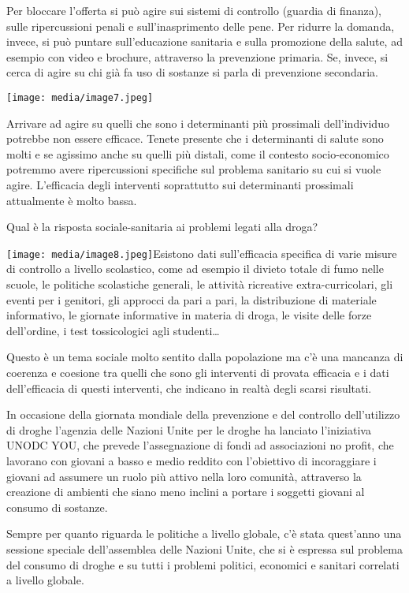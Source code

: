 \documentclass[]{article}
\begin{document}
Per bloccare l'offerta si può agire sui sistemi di controllo (guardia di
finanza), sulle ripercussioni penali e sull'inasprimento delle pene. Per
ridurre la domanda, invece, si può puntare sull'educazione sanitaria e
sulla promozione della salute, ad esempio con video e brochure,
attraverso la prevenzione primaria. Se, invece, si cerca di agire su chi
già fa uso di sostanze si parla di prevenzione secondaria.

\texttt{[image: media/image7.jpeg]}

Arrivare ad agire su quelli che sono i determinanti più prossimali
dell'individuo potrebbe non essere efficace. Tenete presente che i
determinanti di salute sono molti e se agissimo anche su quelli più
distali, come il contesto socio-economico potremmo avere ripercussioni
specifiche sul problema sanitario su cui si vuole agire. L'efficacia
degli interventi soprattutto sui determinanti prossimali attualmente è
molto bassa.

Qual è la risposta sociale-sanitaria ai problemi legati alla droga?

\texttt{[image: media/image8.jpeg]}Esistono dati sull'efficacia
specifica di varie misure di controllo a livello scolastico, come ad
esempio il divieto totale di fumo nelle scuole, le politiche scolastiche
generali, le attività ricreative extra-curricolari, gli eventi per i
genitori, gli approcci da pari a pari, la distribuzione di materiale
informativo, le giornate informative in materia di droga, le visite
delle forze dell'ordine, i test tossicologici agli studenti\ldots{}

Questo è un tema sociale molto sentito dalla popolazione ma c'è una
mancanza di coerenza e coesione tra quelli che sono gli interventi di
provata efficacia e i dati dell'efficacia di questi interventi, che
indicano in realtà degli scarsi risultati.

In occasione della giornata mondiale della prevenzione e del controllo
dell'utilizzo di droghe l'agenzia delle Nazioni Unite per le droghe ha
lanciato l'iniziativa UNODC YOU, che prevede l'assegnazione di fondi ad
associazioni no profit, che lavorano con giovani a basso e medio reddito
con l'obiettivo di incoraggiare i giovani ad assumere un ruolo più
attivo nella loro comunità, attraverso la creazione di ambienti che
siano meno inclini a portare i soggetti giovani al consumo di sostanze.

Sempre per quanto riguarda le politiche a livello globale, c'è stata
quest'anno una sessione speciale dell'assemblea delle Nazioni Unite, che
si è espressa sul problema del consumo di droghe e su tutti i problemi
politici, economici e sanitari correlati a livello globale.
\end{document}
